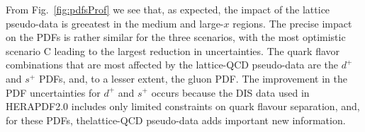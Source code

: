 From Fig.~\ref{fig:pdfsProf} we see that, as expected, the
impact of the lattice pseudo-data is greeatest in the medium and large-$x$ regions.
%
The precise impact on the PDFs is rather
similar for the three scenarios, with the most optimistic
scenario C leading to the largest reduction in uncertainties.
%
The quark flavor combinations that are most affected by the
lattice-QCD pseudo-data are the $d^{+}$ and $s^{+}$ PDFs,
and, to a lesser extent, the gluon PDF.
%
The improvement in the PDF uncertainties for $d^{+}$ and $s^{+}$
occurs because the DIS data
used in HERAPDF2.0 includes only limited constraints
on quark flavour separation, ​and,​ ​for​ ​these​ ​PDFs,​ ​the​ ​lattice-QCD​ ​pseudo-data​ ​adds​ ​important​ ​new
information.
